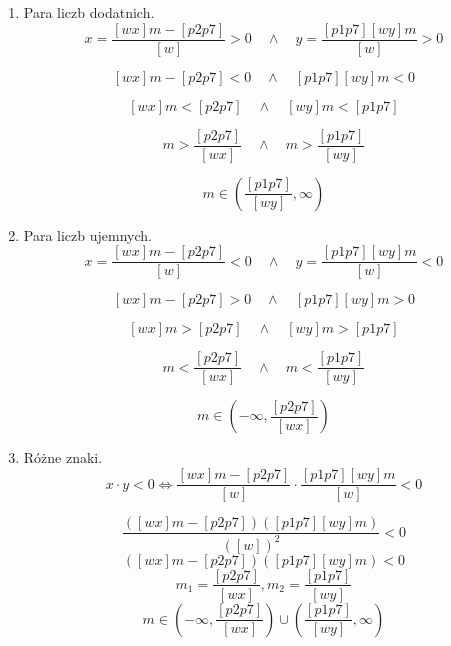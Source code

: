 \documentclass[12pt, a4paper]{article}
\theoremstyle{definition} %
\begin{document}
\begin{enumerate}
    \item Para liczb dodatnich.
    $$x=\frac{[wx]m-[p2p7]}{[w]}>0\quad \land \quad  y=\frac{[p1p7][wy]m}{[w]}>0$$
    
    $$[wx]m-[p2p7]<0 \quad \land \quad [p1p7][wy]m<0$$
    
    $$[wx]m<[p2p7] \quad \land \quad [wy]m<[p1p7]$$
    
    $$m>\frac{[p2p7]}{[wx]} \quad \land \quad m>\frac{[p1p7]}{[wy]}$$
    
    $$m\in\left(\frac{[p1p7]}{[wy]} ,\infty\right)$$
    
    \item Para liczb ujemnych.
    $$x=\frac{[wx]m-[p2p7]}{[w]}<0\quad \land \quad  y=\frac{[p1p7][wy]m}{[w]}<0$$
    
    $$[wx]m-[p2p7]>0 \quad \land \quad [p1p7][wy]m>0$$
    
     $$[wx]m>[p2p7] \quad \land \quad [wy]m>[p1p7]$$
     
      $$m<\frac{[p2p7]}{[wx]} \quad \land \quad m<\frac{[p1p7]}{[wy]}$$
      
       $$m\in\left(-\infty,\frac{[p2p7]}{[wx]} \right) $$
      
      \item Różne znaki.
      $$x\cdot y <0 \iff \frac{[wx]m-[p2p7]}{[w]} \cdot \frac{[p1p7][wy]m}{[w]}<0$$
      
      $$\frac{([wx]m-[p2p7])([p1p7][wy]m)}{([w])^{2}}<0 $$
      $$([wx]m-[p2p7])([p1p7][wy]m)<0$$
      $$m_{1}=\frac{[p2p7]}{[wx]}, m_{2}=\frac{[p1p7]}{[wy]} $$
      $$m\in\left(-\infty,\frac{[p2p7]}{[wx]} \right) \cup \left(\frac{[p1p7]}{[wy]}  ,\infty\right)$$
    
\end{enumerate}
\end{document}
